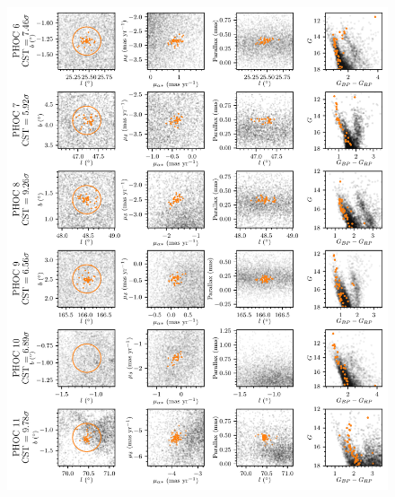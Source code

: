 \begin{figure}[ht]
   \centering
   \includegraphics[width=\textwidth]{fig/c2/fig_new_ocs_1.pdf}
   \caption[Plots of the new OCs PHOC 6 to 11]{}%
   \label{app:c2:fig:new_ocs_1}
\end{figure}

